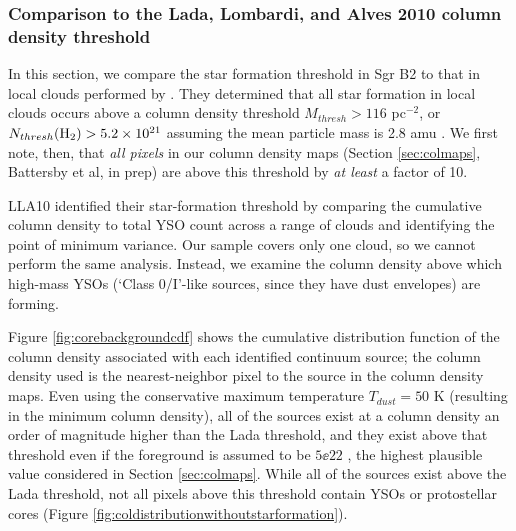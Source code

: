 \documentclass[twocolumn]{aastex61}
\begin{document}
\subsubsection{Comparison to the Lada, Lombardi, and Alves 2010 column density threshold}
\label{sec:ladathreshold}
In this section, we compare the star formation threshold in Sgr B2 to that in
local clouds performed by \citet[][hereafter, LLA10]{Lada2010a}.  They determined
that all star
formation in local clouds occurs above a column density threshold $M_{thresh} >
116$ \msun pc$^{-2}$, or $N_{thresh}(\textrm{H}_{2}) > 5.2\times10^{21}$ \persc assuming the
mean particle mass is 2.8 amu \citep{Kauffmann2008a}.  We first note, then,
that \emph{all pixels} in our column density maps (Section \ref{sec:colmaps},
Battersby et al, in prep) are above this threshold by \emph{at least} a factor
of 10.

LLA10 identified their star-formation threshold by comparing the
cumulative column density to total YSO count across a range of clouds and
identifying the point of minimum variance.  Our sample covers only one cloud,
so we cannot perform the same analysis.  Instead, we examine the column density
above which high-mass YSOs (`Class 0/I'-like sources, since they have dust
envelopes) are forming.

Figure \ref{fig:corebackgroundcdf} shows the cumulative distribution function
of the column density associated with each identified continuum source; the
column density used is the nearest-neighbor pixel to the source in the column
density maps.  Even using the conservative maximum temperature $T_{dust}=50$ K
(resulting in the minimum column density), all of the sources exist at a column
density an order of magnitude higher than the Lada threshold, and they exist
above that threshold even if the foreground is assumed to be $5\ee{22}$ \persc,
the highest plausible value considered in Section \ref{sec:colmaps}.
While all of the sources exist above the Lada threshold, not all pixels above
this threshold contain YSOs or protostellar cores (Figure
\ref{fig:coldistributionwithoutstarformation}).
\end{document}
